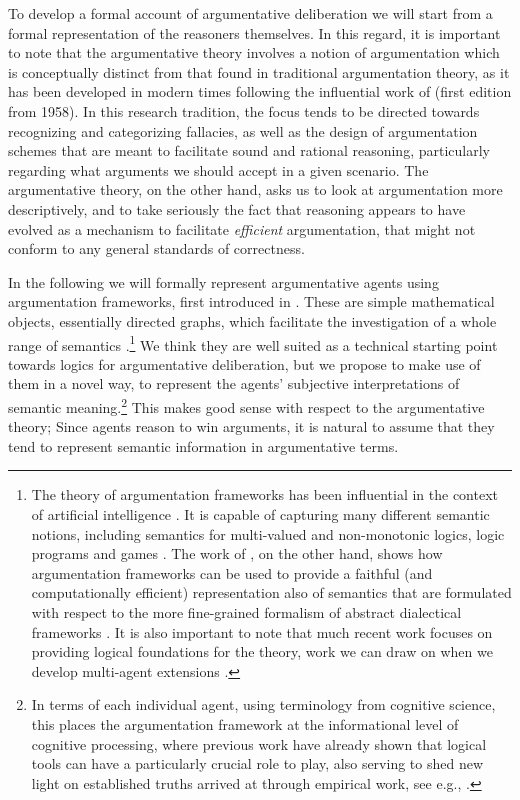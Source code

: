 \documentclass[greybox]{svmult}
\begin{document}
To develop a formal account of argumentative deliberation we will start from a formal representation of the reasoners themselves. In this regard, it is important to note that the argumentative theory involves a notion of argumentation which is conceptually distinct from that found in traditional argumentation theory, as it has been developed in modern times following the influential work of \cite{toulmin} (first edition from 1958). In this research tradition, the focus tends to be directed towards recognizing and categorizing fallacies, as well as the design of argumentation schemes that are meant to facilitate sound and rational reasoning, particularly regarding what arguments we should accept in a given scenario. The argumentative theory, on the other hand, asks us to look at argumentation more descriptively, and to take seriously the fact that reasoning appears to have evolved as a mechanism to facilitate \emph{efficient} argumentation, that might not conform to any general standards of correctness.

In the following we will formally represent argumentative agents using argumentation frameworks, first introduced in \cite{dung}. These are simple mathematical objects, essentially directed graphs, which facilitate the investigation of a whole range of semantics \cite{baroni}.\footnote{The theory of argumentation frameworks has been influential in the context of artificial intelligence \cite{rahwan}. It is capable of capturing many different semantic notions, including semantics for multi-valued and non-monotonic logics, logic programs and games \cite{dung,dyrkolbotn}. The work of \cite{brewka}, on the other hand, shows how argumentation frameworks can be used to provide a faithful (and computationally efficient) representation also of semantics that are formulated with respect to the more fine-grained formalism of abstract dialectical frameworks \cite{brewka1}. It is also important to note that much recent work focuses on providing logical foundations for the theory, work we can draw on when we develop multi-agent extensions  \cite{grossi,grossi1,arieli,caminada}.} We think they are well suited as a technical starting point towards logics for argumentative deliberation, but we propose to make use of them in a novel way, to represent the agents' subjective interpretations of semantic meaning.\footnote{In terms of each individual agent, using terminology from cognitive science, this places the argumentation framework at the informational level of cognitive processing, where previous work have already shown that logical tools can have a particularly crucial role to play, also serving to shed new light on established truths arrived at through empirical work, see e.g., \cite{stenning}.} This makes good sense with respect to the argumentative theory; Since agents reason to win arguments, it is natural to assume that they tend to represent semantic information in argumentative terms.
\end{document}
